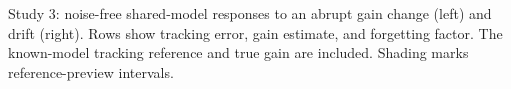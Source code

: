 \caption{Study 3: noise-free shared-model responses to an abrupt gain
change (left) and drift (right). Rows show tracking error, gain estimate,
and forgetting factor. The known-model tracking reference and true gain
are included. Shading marks reference-preview intervals.}
